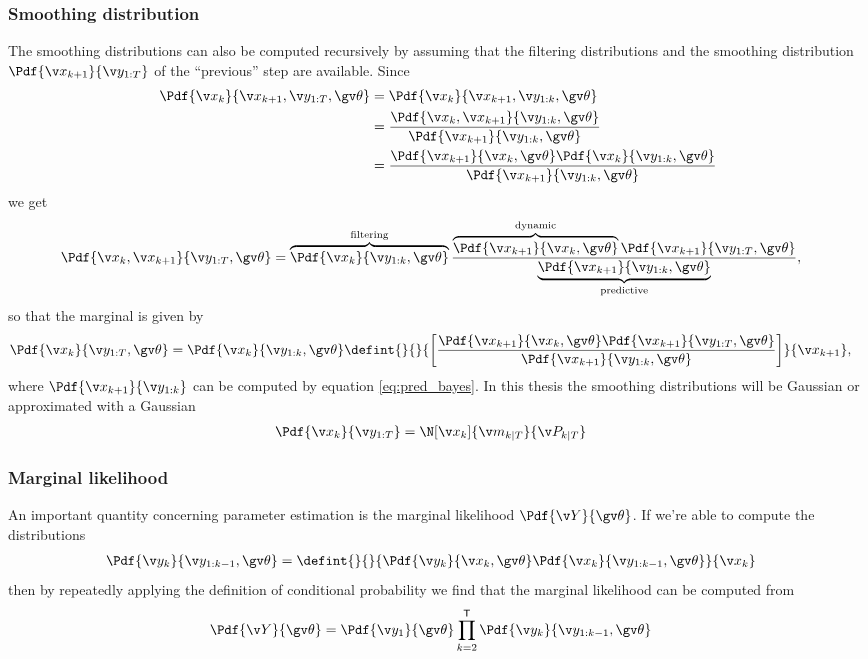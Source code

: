 \subsubsection*{Smoothing distribution}
The smoothing distributions can also be computed recursively by assuming that the filtering distributions
and the smoothing distribution $\Pdf{\x_{k+1}}{\y_{1:T}}$ of the ``previous'' step are available.
Since
\begin{align*}
	\Pdf{\xk}{\x_{k+1},\y_{1:T},\Th}&=\Pdf{\xk}{\x_{k+1},\y_{1:k},\Th}\\
	&=\frac{\Pdf{\xk,\x_{k+1}}{\y_{1:k},\Th}}{\Pdf{\x_{k+1}}{\y_{1:k},\Th}}\\
	&=\frac{\Pdf{\x_{k+1}}{\xk,\Th}\Pdf{\xk}{\y_{1:k},\Th}}{\Pdf{\x_{k+1}}{\y_{1:k},\Th}}
\end{align*}
we get
\begin{align}
	\Pdf{\xk,\x_{k+1}}{\y_{1:T},\Th}&=\overbrace{\Pdf{\xk}{\y_{1:k},\Th}}^\text{filtering}\frac{\overbrace{\Pdf{\x_{k+1}}{\xk,\Th}}^\text{dynamic}\Pdf{\x_{k+1}}{\y_{1:T},\Th}}{\underbrace{\Pdf{\x_{k+1}}{\y_{1:k},\Th}}_\text{predictive}},
	\label{eq:smooth_joint_bayes}
\end{align}
so that the marginal is given by
\begin{align}
	\Pdf{\xk}{\y_{1:T},\Th}&=\Pdf{\xk}{\y_{1:k},\Th}\defint{}{}{\left[\frac{\Pdf{\x_{k+1}}{\xk,\Th}\Pdf{\x_{k+1}}{\y_{1:T},\Th}}{\Pdf{\x_{k+1}}{\y_{1:k},\Th}}\right]}{\x_{k+1}},
	\label{eq:smooth_bayes}
\end{align}
where $\Pdf{\x_{k+1}}{\y_{1:k}}$ can be computed by equation \eqref{eq:pred_bayes}.
In this thesis the smoothing distributions will be Gaussian or approximated with a Gaussian
\begin{align}
	\Pdf{\xk}{\y_{1:T}}&=\N[\xk]{\m_{k|T}}{\P_{k|T}}
\end{align}

\subsubsection*{Marginal likelihood}

An important quantity concerning parameter estimation is the marginal likelihood $\Pdf{\Y}{\Th}$. 
If we're able to compute the distributions
\begin{align}
	\Pdf{\y_k}{\y_{1:k-1},\Th}&=\defint{}{}{\Pdf{\yk}{\xk,\Th}\Pdf{\xk}{\y_{1:k-1},\Th}}{\xk}
\end{align}
then by repeatedly applying the definition of conditional probability 
we find that the marginal likelihood can be computed from
\begin{align}
	\Pdf{\Y}{\Th}&=\Pdf{\y_1}{\Th}\prod_{k=2}^\tr \Pdf{\y_k}{\y_{1:k-1},\Th}
	\label{eq:lh_factorization}
\end{align}





